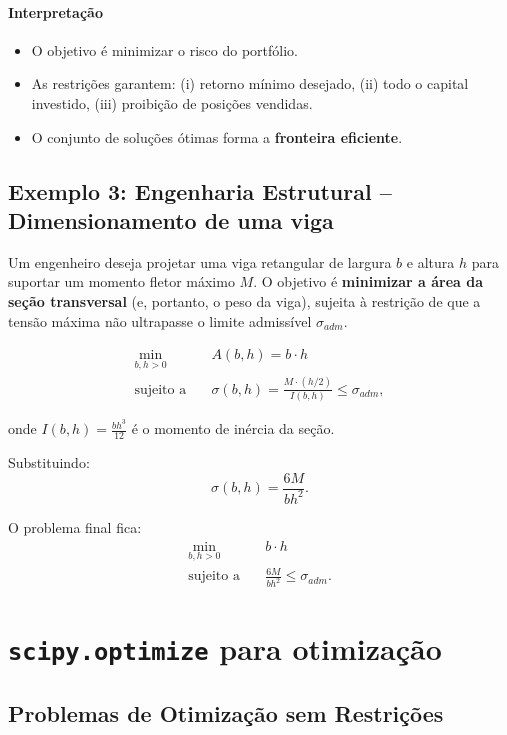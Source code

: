 \documentclass[9pt,a4paper]{extarticle}
\begin{document}
\paragraph{Interpretação}
\begin{itemize}
    \item O objetivo é minimizar o risco do portfólio.
    \item As restrições garantem: (i) retorno mínimo desejado, (ii) todo o capital investido, (iii) proibição de posições vendidas.
    \item O conjunto de soluções ótimas forma a \textbf{fronteira eficiente}.
\end{itemize}

\subsection*{Exemplo 3: Engenharia Estrutural -- Dimensionamento de uma viga}

Um engenheiro deseja projetar uma viga retangular de largura $b$ e altura $h$ para suportar um momento fletor máximo $M$.  
O objetivo é \textbf{minimizar a área da seção transversal} (e, portanto, o peso da viga), sujeita à restrição de que a tensão máxima não ultrapasse o limite admissível $\sigma_{adm}$.

\[
\begin{aligned}
\min_{b,h > 0} \quad & A(b,h) = b \cdot h \\
\text{sujeito a} \quad & \sigma(b,h) = \frac{M \cdot (h/2)}{I(b,h)} \leq \sigma_{adm},
\end{aligned}
\]

onde $I(b,h) = \tfrac{b h^3}{12}$ é o momento de inércia da seção.

Substituindo:
\[
\sigma(b,h) = \frac{6M}{b h^2}.
\]

O problema final fica:
\[
\begin{aligned}
\min_{b,h > 0} \quad & b \cdot h \\
\text{sujeito a} \quad & \frac{6M}{b h^2} \leq \sigma_{adm}.
\end{aligned}
\]

\section{\texttt{scipy.optimize} para otimização}

\subsection{Problemas de Otimização sem Restrições}
\end{document}
